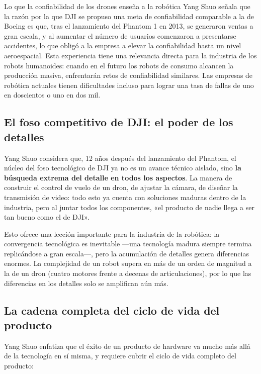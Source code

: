 \documentclass[a4paper]{article}
\begin{document}
\begin{importantbox}{Lo que la confiabilidad de los drones enseña a la robótica}
Yang Shuo señala que la razón por la que DJI se propuso una meta de confiabilidad comparable a la de Boeing es que, tras el lanzamiento del Phantom 1 en 2013, se generaron ventas a gran escala, y al aumentar el número de usuarios comenzaron a presentarse accidentes, lo que obligó a la empresa a elevar la confiabilidad hasta un nivel aeroespacial. Esta experiencia tiene una relevancia directa para la industria de los robots humanoides: cuando en el futuro los robots de consumo alcancen la producción masiva, enfrentarán retos de confiabilidad similares. Las empresas de robótica actuales tienen dificultades incluso para lograr una tasa de fallas de uno en doscientos o uno en dos mil.
\end{importantbox}

\subsection{El foso competitivo de DJI: el poder de los detalles}

Yang Shuo considera que, 12 años después del lanzamiento del Phantom, el núcleo del foso tecnológico de DJI ya no es un avance técnico aislado, sino \textbf{la búsqueda extrema del detalle en todos los aspectos}. La manera de construir el control de vuelo de un dron, de ajustar la cámara, de diseñar la transmisión de video: todo esto ya cuenta con soluciones maduras dentro de la industria, pero al juntar todos los componentes, «el producto de nadie llega a ser tan bueno como el de DJI».

Esto ofrece una lección importante para la industria de la robótica: la convergencia tecnológica es inevitable —una tecnología madura siempre termina replicándose a gran escala—, pero la acumulación de detalles genera diferencias enormes. La complejidad de un robot supera en más de un orden de magnitud a la de un dron (cuatro motores frente a decenas de articulaciones), por lo que las diferencias en los detalles solo se amplifican aún más.

\subsection{La cadena completa del ciclo de vida del producto}

Yang Shuo enfatiza que el éxito de un producto de hardware va mucho más allá de la tecnología en sí misma, y requiere cubrir el ciclo de vida completo del producto:
\end{document}
